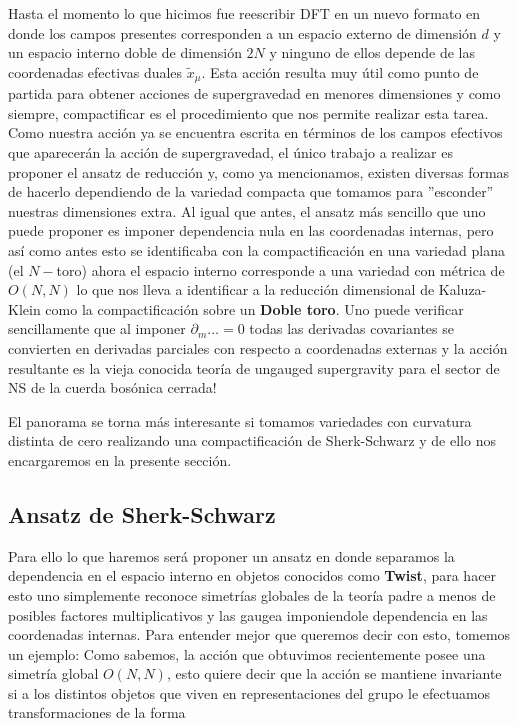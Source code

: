 \documentclass{article}
\numberwithin{equation}{section}
\begin{document}
Hasta el momento lo que hicimos fue reescribir DFT en un nuevo formato en donde los campos presentes corresponden a un espacio externo de dimensión $ d $ y un espacio interno doble de dimensión $ 2N $ y ninguno de ellos depende de las coordenadas efectivas duales $ \widetilde{x}_{\mu} $. Esta acción resulta muy útil como punto de partida para obtener acciones de supergravedad en menores dimensiones y como siempre, compactificar es el procedimiento que nos permite realizar esta tarea. Como nuestra acción ya se encuentra escrita en términos de los campos efectivos que aparecerán la acción de supergravedad, el único trabajo a realizar es proponer el ansatz de reducción y, como ya mencionamos, existen diversas formas de hacerlo dependiendo de la variedad compacta que tomamos para ''esconder'' nuestras dimensiones extra. Al igual que antes, el ansatz más sencillo que uno puede proponer es imponer dependencia nula en las coordenadas internas, pero así como antes esto se identificaba con la compactificación en una variedad plana (el $ N-$toro) ahora el espacio interno corresponde a una variedad con métrica de $ O(N,N) $ lo que nos lleva a identificar a la reducción dimensional de Kaluza-Klein como la compactificación sobre un \textbf{Doble toro}. Uno puede verificar sencillamente que al imponer $ \partial_m \dots =0 $ todas las derivadas covariantes se convierten en derivadas parciales con respecto a coordenadas externas y la acción resultante es la vieja conocida teoría de ungauged supergravity para el sector de NS de la cuerda bosónica cerrada!

El panorama se torna más interesante si tomamos variedades con curvatura distinta de cero realizando una compactificación de Sherk-Schwarz y de ello nos encargaremos en la presente sección.


\subsection{\textcolor{white!60!teal}{Ansatz de Sherk-Schwarz}}

Para ello lo que haremos será proponer un ansatz en donde separamos la dependencia en el espacio interno en objetos conocidos como \textbf{Twist}, para hacer esto uno simplemente reconoce simetrías globales de la teoría padre a menos de posibles factores multiplicativos y las gaugea imponiendole dependencia en las coordenadas internas. Para entender mejor que queremos decir con esto, tomemos un ejemplo: Como sabemos, la acción que obtuvimos recientemente posee una simetría global $ O(N,N) $, esto quiere decir que la acción se mantiene invariante si a los distintos objetos que viven en representaciones del grupo le efectuamos transformaciones de la forma
\end{document}
